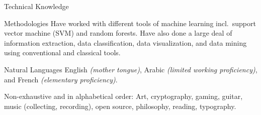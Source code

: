 \documentclass[10pt,a4paper]{article}
\begin{document}


\nocite{Latent2012}
\nocite{DCSI2012}
\nocite{Ref2013}
\nocite{Lisbon2015}
\nocite{Pylogeny}
\nocite{Thesis} %
\printbibliography[heading=none]

\spacedhrule{0.5em}{-0.4em} %



\inlineheadsection
{Technical Knowledge}
{\hspace{24pt} }

\inlineheadsection 
{Methodologies}
{Have worked with different tools of machine learning incl.\ support vector machine (SVM) and random forests. Have also done a large deal of information extraction, data classification, data visualization, and data mining using conventional and classical tools.}

\inlineheadsection 
{Natural Languages}
{English \textit{(mother tongue)}, Arabic \textit{(limited working proficiency)}, and French \textit{(elementary proficiency)}.}


\spacedhrule{1.6em}{-0.4em} %



\inlineheadsection %
{Non-exhaustive and in alphabetical order:}
{Art, cryptography, gaming, guitar, music (collecting, recording), open source, philosophy, reading, typography.}

\end{document}
